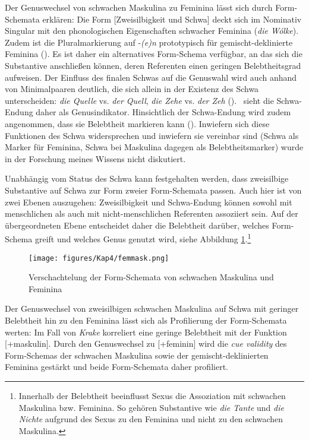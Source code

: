 \begin{sloppypar}
Der Genuswechsel von schwachen Maskulina zu Feminina  lässt sich durch Form-Schemata erklären: Die Form [Zweisilbigkeit und Schwa] deckt sich im Nominativ Singular mit den phonologischen Eigenschaften schwacher Feminina (\textit{die Wólke}). Zudem ist die Pluralmarkierung auf -\textit{(e)n} prototypisch für gemischt-deklinierte Feminina (\cite[115]{Kopcke.2000}). Es ist daher ein alternatives Form-Schema verfügbar, an das sich die Substantive anschließen können, deren Referenten einen geringen Belebtheitsgrad aufweisen. Der Einfluss des finalen Schwas auf die Genuswahl wird auch anhand von Minimalpaaren deutlich, die sich allein in der Existenz des Schwa unterscheiden: \textit{die Quelle} vs. \textit{der Quell}, \textit{die Zehe} vs. \textit{der Zeh} (\cite[168]{Nubling.2016}).\ \textcite[128]{Kopcke.1993} sieht die Schwa-Endung daher als Genusindikator. Hinsichtlich der Schwa-Endung wird zudem angenommen, dass sie Belebtheit markieren kann (\cite[75]{Kopcke.2005}). Inwiefern sich diese Funktionen des Schwa widersprechen und inwiefern sie vereinbar sind (Schwa als Marker für Feminina, Schwa bei Maskulina dagegen als Belebtheitsmarker) wurde in der Forschung meines Wissens nicht diskutiert. 
\end{sloppypar}


Unabhängig vom Status des Schwa kann festgehalten werden, dass zweisilbige Substantive auf Schwa zur Form zweier Form-Schemata passen. Auch hier ist von zwei Ebenen auszugehen: Zweisilbigkeit und Schwa-Endung können sowohl mit menschlichen als auch mit nicht-menschlichen Referenten assoziiert sein. Auf der übergeordneten Ebene entscheidet daher die Belebtheit darüber, welches Form-Schema greift und welches Genus genutzt wird, siehe Abbildung \ref{femmask}.\footnote{Innerhalb der Belebtheit beeinflusst Sexus die Assoziation mit schwachen Maskulina bzw. Feminina. So gehören Substantive wie \textit{die Tante} und \textit{die Nichte} aufgrund des Sexus zu den Feminina und nicht zu den schwachen Maskulina.} 

\begin{figure}
\texttt{[image: figures/Kap4/femmask.png]}  
\caption{Verschachtelung der Form-Schemata von schwachen Maskulina und Feminina}
\label{femmask}
\end{figure} 

Der Genuswechsel von zweisilbigen schwachen Maskulina auf Schwa mit geringer Belebtheit hin zu den Feminina lässt sich als Profilierung der Form-Sche\-ma\-ta werten: Im Fall von \textit{Krake} korreliert eine geringe Belebtheit mit der Funktion [+maskulin]. Durch den Genuswechsel zu [+feminin] wird die \textit{cue validity} des Form-Schemas der schwachen Maskulina sowie der gemischt-deklinierten Feminina gestärkt und beide Form-Schemata daher profiliert. 

